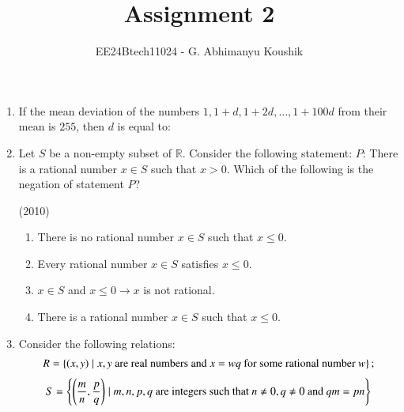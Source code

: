 \documentclass[journal,12pt,twocolumn]{IEEEtran}
\theoremstyle{remark}
\begin{document}
\title{Assignment 2}
\author{EE24Btech11024 - G. Abhimanyu Koushik}
\maketitle
\newpage
\bigskip
\renewcommand{\thefigure}{\theenumi}
\renewcommand{\thetable}{\theenumi}
\begin{enumerate}
    \item If the mean deviation of the numbers $1, 1+d, 1+2d, \dots, 1+100d$ from their mean is $255$, then $d$ is equal to:
    
    \hfill{}
    \begin{enumerate}
    \end{enumerate}
    
    \item Let $S$ be a non-empty subset of $\mathbb{R}$. Consider the following statement:\newline
    $P$: There is a rational number $x \in S$ such that $x>0$.\newline
    Which of the following is the negation of statement $P$?
    
    \hfill{(2010)}
    \begin{enumerate}
    \item There is no rational number $x \in S$ such that $x \leq 0$.
    \item Every rational number $x \in S$ satisfies $x \leq 0$.
    \item $x \in S$ and $x \leq 0 \longrightarrow x$ is not rational.
    \item There is a rational number $x \in S$ such that $x \leq 0$.
    \end{enumerate}
    
    \item Consider the following relations: \newline
    \begin{align*}
    R = \left\{\left(x, y\right) \mid x,y \text{ are real numbers and } x = wq \text{ for some rational number } w\right\}; 
    \end{align*}
    \begin{align*}
    S = \left\{\left(\frac{m}{n}, \frac{p}{q}\right) \mid m, n, p, q \text{ are integers such that } n \neq 0, q \neq 0 \text{ and } qm = pn\right\}
    \end{align*}
    

\end{enumerate}
\end{document}
